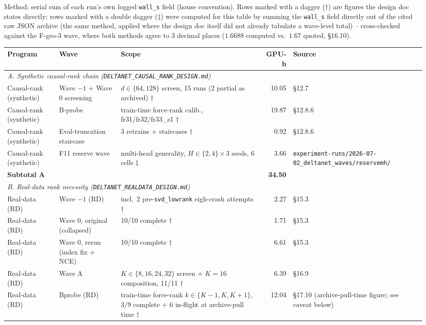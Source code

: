 Method: serial sum of each run's own logged \texttt{wall\_s} field (house
convention). Rows marked with a dagger ($\dagger$) are figures the design
doc states directly; rows marked with a double dagger ($\ddagger$) were
computed for this table by summing the \texttt{wall\_s} field directly out
of the cited raw JSON archive (the same method, applied where the design
doc itself did not already tabulate a wave-level total) -- cross-checked
against the F-geo-3 wave, where both methods agree to 3 decimal places
($1.6688$ computed vs.\ $1.67$ quoted, \S16.10).

\begin{table}[htbp]
\centering
\scriptsize
\begin{tabular}{p{3.6cm}p{3.6cm}p{5.6cm}rl}
\toprule
Program & Wave & Scope & GPU-h & Source \\
\midrule
\multicolumn{5}{l}{\textit{A. Synthetic causal-rank chain (\texttt{DELTANET\_CAUSAL\_RANK\_DESIGN.md})}} \\
Causal-rank (synthetic) & Wave $-1$ + Wave 0 screening & $d\in\{64,128\}$ screen, 15 runs (2 partial as archived) $\dagger$ & 10.05 & \S12.7 \\
Causal-rank (synthetic) & B-probe & train-time force-rank calib., fr31/fr32/fr33\_s1 $\dagger$ & 19.87 & \S12.8.6 \\
Causal-rank (synthetic) & Eval-truncation staircase & 3 retrains + staircases $\dagger$ & 0.92 & \S12.8.6 \\
Causal-rank (synthetic) & F11 reserve wave & multi-head generality, $H\in\{2,4\}\times3$ seeds, 6 cells $\ddagger$ & 3.66 & \texttt{experiment-runs/2026-07-02\_deltanet\_waves/reservemh/} \\
\textbf{Subtotal A} & & & \textbf{34.50} & \\
\midrule
\multicolumn{5}{l}{\textit{B. Real-data rank necessity (\texttt{DELTANET\_REALDATA\_DESIGN.md})}} \\
Real-data (RD) & Wave $-1$ (RD) & incl.\ 2 pre-\texttt{svd\_lowrank} eigh-crash attempts $\dagger$ & 2.27 & \S15.3 \\
Real-data (RD) & Wave 0, original (collapsed) & 10/10 complete $\dagger$ & 1.71 & \S15.3 \\
Real-data (RD) & Wave 0, rerun (index fix + NCE) & 10/10 complete $\dagger$ & 6.61 & \S15.3 \\
Real-data (RD) & Wave A & $K\in\{8,16,24,32\}$ screen + $K{=}16$ composition, 11/11 $\dagger$ & 6.39 & \S16.9 \\
Real-data (RD) & Bprobe (RD) & train-time force-rank $k\in\{K{-}1,K,K{+}1\}$, 3/9 complete + 6 in-flight at archive-pull time $\dagger$ & 12.04 & \S17.10 (archive-pull-time figure; see caveat below) \\

\end{tabular}
\end{table}
